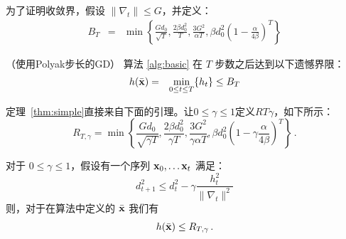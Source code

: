 为了证明收敛界，假设 $\|\nabla_t\| \leq G$，并定义：
\begin{eqnarray*}
  B_T    &=&  \min\left\{
  \frac{G d_0}{\sqrt{ T}},
  \frac {2 \beta d_0^2}{ T },
  \frac{3 G^2}{  \alpha  T } ,
   \beta d_0^2\left(1-\frac{\alpha}{4\beta}\right)^T
 \right\}
\end{eqnarray*}

\begin{theorem} \label{thm:simple}
（使用Polyak步长的GD）
算法 \ref{alg:basic} 在 $T$ 步数之后达到以下遗憾界限：
\begin{eqnarray*}
h(\xbar)  &=& \min_{ 0 \leq t \leq  T} \{ h_t \} \leq B_T %
\end{eqnarray*}
\end{theorem}




定理~\ref{thm:simple}直接来自下面的引理。让$0\leq\gamma\leq 1$定义$R{T\gamma}$，如下所示：
\[
  R_{T,\gamma} = \min\left\{
  \frac{G d_0}{\sqrt{\gamma T}},
  \frac {2 \beta d_0^2}{\gamma T },
  \frac{ 3 G^2}{{\gamma}  \alpha  T } ,
   \beta d_0^2\left(1-\gamma\frac{\alpha}{4 \beta}\right)^T
 \right\}
\, .
\]

\begin{lemma} \label{lemma:shalom2}
对于 $0\leq \gamma \leq 1 $，假设有一个序列  $\mathbf x_0, \ldots \mathbf x_t$  满足：
\begin{equation} \label{eqn:shalom3}
d_{t+1}^2 \leq d_t^2 -  \gamma \frac{ h_t^2}{\|\nabla_t\|^2}
\end{equation}
则，对于在算法中定义的 $\bar{\mathbf{x}}$ 
我们有
\[
h(\bar{\mathbf{x}})  \leq   R_{T,\gamma}\, .
\]
\end{lemma}



